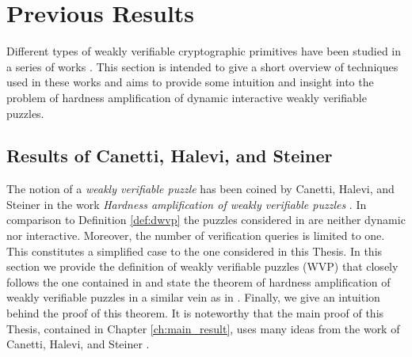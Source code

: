 \section{Previous Results}
\label{st:previous_results}
Different types of weakly verifiable cryptographic primitives have been studied in a series of works
\cite{canetti2004hardness, Dodis:2009:SAI:1530441.1530450, DBLP:journals/corr/abs-1002-3534}.
This section is intended to give a short overview of techniques used in these works
and aims to provide some intuition and insight into the problem of hardness amplification
of dynamic interactive weakly verifiable puzzles.
\subsection{Results of Canetti, Halevi, and Steiner}
\label{subsec:chs}
The notion of a \textit{weakly verifiable puzzle} has been coined by Canetti, Halevi, and Steiner in the work
\textit{Hardness amplification of weakly verifiable puzzles} \cite{canetti2004hardness}.
In comparison to Definition \ref{def:dwvp} the puzzles considered in \cite{canetti2004hardness} are neither dynamic nor interactive.
Moreover, the number of verification queries is limited to one.
This constitutes a simplified case to the one considered in this Thesis.
In this section we provide the definition of weakly verifiable puzzles (WVP) that closely follows the one contained in \cite{canetti2004hardness}
and state the theorem of hardness amplification of weakly verifiable puzzles in a similar vein as in \cite{canetti2004hardness}.
Finally, we give an intuition behind the proof of this theorem.
It is noteworthy that the main proof of this Thesis, contained in Chapter \ref{ch:main_result},
uses many ideas from the work of Canetti, Halevi, and Steiner \cite{canetti2004hardness}.
%
